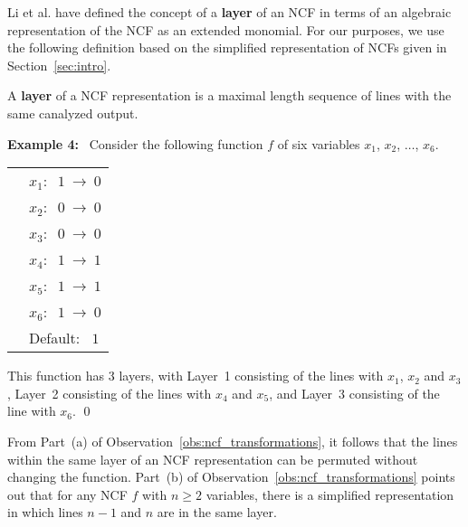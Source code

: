 \noindent
Li et al. \cite{Li-etal-2013} have defined the concept of a 
{\bf layer} of an NCF in terms of
an algebraic representation of the NCF as an extended monomial.
For our purposes, we use the following definition based on the
simplified representation of NCFs given in Section~\ref{sec:intro}.

\begin{definition}
\label{def:layer}
A {\bf layer} of a NCF representation is a maximal length sequence 
of lines with the same canalyzed output.
\end{definition}

\noindent
\textbf{Example 4:}~ Consider the following function $f$ of six variables
$x_1$, $x_2$, $\ldots$, $x_6$. 

\bigskip

\noindent
\begin{tabular}{ll}
\hspace*{1.1in} & $x_1:~$  $1 ~\longrightarrow~ 0$ \\ [0.5ex]
\hspace*{1.1in} & $x_2:~$  $0 ~\longrightarrow~ 0$ \\ [0.5ex]
\hspace*{1.1in} & $x_3:~$  $0 ~\longrightarrow~ 0$ \\ [0.5ex]
\hspace*{1.1in} & $x_4:~$  $1 ~\longrightarrow~ 1$ \\ [0.5ex]
\hspace*{1.1in} & $x_5:~$  $1 ~\longrightarrow~ 1$ \\ [0.5ex]
\hspace*{1.1in} & $x_6:~$  $1 ~\longrightarrow~ 0$ \\ [0.5ex]
\hspace*{1.1in} & Default:~ $1$ \\
\end{tabular}

\medskip
\noindent
This function has 3 layers, with 
Layer~1 consisting of the lines with $x_1$, $x_2$ and $x_3$, 
Layer~2 consisting of the lines with $x_4$ and $x_5$, and
Layer~3 consisting of the line with $x_6$.  \qed

\medskip
From Part~(a) of Observation~\ref{obs:ncf_transformations},
it follows that the lines within the same layer of an NCF
representation can be permuted without changing the function.
Part~(b) of Observation~\ref{obs:ncf_transformations} points
out that for any NCF $f$ with $n \geq 2$ variables, there is a simplified 
representation in which lines $n-1$ and $n$ are in the same layer.

